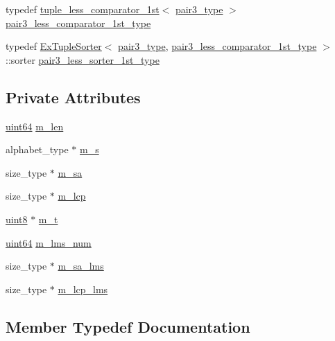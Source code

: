 \begin{DoxyCompactItemize}
\item 
typedef \hyperlink{structtuple__less__comparator__1st}{tuple\+\_\+less\+\_\+comparator\+\_\+1st}$<$ \hyperlink{class_test_a9c312a6616c86eaf224d04d298f58ed4}{pair3\+\_\+type} $>$ \hyperlink{class_test_a5ebabea22d5111680c158fb28c7cc935}{pair3\+\_\+less\+\_\+comparator\+\_\+1st\+\_\+type}
\item 
typedef \hyperlink{struct_ex_tuple_sorter}{Ex\+Tuple\+Sorter}$<$ \hyperlink{class_test_a9c312a6616c86eaf224d04d298f58ed4}{pair3\+\_\+type}, \hyperlink{class_test_a5ebabea22d5111680c158fb28c7cc935}{pair3\+\_\+less\+\_\+comparator\+\_\+1st\+\_\+type} $>$\+::sorter \hyperlink{class_test_aa25f2080d593eb18d6e5e475d99bac17}{pair3\+\_\+less\+\_\+sorter\+\_\+1st\+\_\+type}
\end{DoxyCompactItemize}
\subsection*{Private Attributes}
\begin{DoxyCompactItemize}
\item 
\hyperlink{types_8h_a60e8696a4678cd348e991a1f172e53f7}{uint64} \hyperlink{class_test_ac0031d768664e62b04aa14acaecdb354}{m\+\_\+len}
\item 
alphabet\+\_\+type $\ast$ \hyperlink{class_test_a2992148c8dda566ae4f4ebbdb26bdccd}{m\+\_\+s}
\item 
size\+\_\+type $\ast$ \hyperlink{class_test_a38956729bdb63c0bfe7760e827769309}{m\+\_\+sa}
\item 
size\+\_\+type $\ast$ \hyperlink{class_test_aba44b9a05184fb5f62f4901fd607da40}{m\+\_\+lcp}
\item 
\hyperlink{types_8h_a115946cb5fc5879545e9ccea096a6031}{uint8} $\ast$ \hyperlink{class_test_ad5db148e90886fc6524a1f07194df9a9}{m\+\_\+t}
\item 
\hyperlink{types_8h_a60e8696a4678cd348e991a1f172e53f7}{uint64} \hyperlink{class_test_a3a2c92b2ace889d7c98d1188ee2542c5}{m\+\_\+lms\+\_\+num}
\item 
size\+\_\+type $\ast$ \hyperlink{class_test_a557862839f4ead2e08d12e7770340ded}{m\+\_\+sa\+\_\+lms}
\item 
size\+\_\+type $\ast$ \hyperlink{class_test_a94d43daa04ae5011cc46d8fd3dc8c83b}{m\+\_\+lcp\+\_\+lms}
\end{DoxyCompactItemize}


\subsection{Member Typedef Documentation}
\mbox{\label{class_test_aace52a5af52c5d5f457ec201881ab2ab}} 
